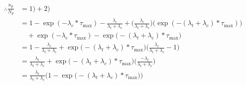 \documentclass[10pt, letter]{article}
\begin{document}
\begin{align*}
\therefore \frac{n_p}{N_p} &= 1) + 2)\\
&= 1 - \exp(-\lambda_c * \tau_\mathrm{max}) - \frac{\lambda_c}{\lambda_t + \lambda_c} + \Big(\frac{\lambda_c}{\lambda_t + \lambda_c}\Big)\Big(\exp(-(\lambda_t+\lambda_c)*\tau_\mathrm{max})\Big) \\
&\quad + \exp(-\lambda_c*\tau_\mathrm{max}) - \exp\big(-(\lambda_t + \lambda_c)*\tau_\mathrm{max}\big)\\
&= 1 - \frac{\lambda_c}{\lambda_t + \lambda_c} + \exp\big(-(\lambda_t + \lambda_c)*\tau_\mathrm{max}\big)\big( \frac{\lambda_c}{\lambda_t + \lambda_c} - 1\big)\\
&= \frac{\lambda_t}{\lambda_t + \lambda_c} +  \exp\big(-(\lambda_t + \lambda_c)*\tau_\mathrm{max}\big)\Big(\frac{-\lambda_t}{\lambda_t + \lambda_c}\Big)\\
&= \frac{\lambda_t}{\lambda_t + \lambda_c} \Big( 1 -  \exp\big(-(\lambda_t + \lambda_c)*\tau_\mathrm{max}\big)\Big)\\
\end{align*}
\end{document}

